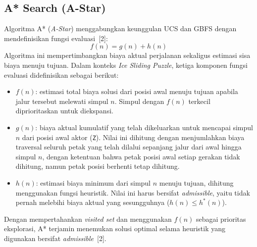 \documentclass[12pt,a4paper]{article}
\begin{document}
\subsection{A* Search (A-Star)}
Algoritma A* (\textit{A-Star}) menggabungkan keunggulan UCS dan GBFS dengan
mendefinisikan fungsi evaluasi~[2]:
\[
  f(n) = g(n) + h(n)
\]
Algoritma ini mempertimbangkan biaya aktual perjalanan sekaligus estimasi sisa biaya
menuju tujuan. Dalam konteks \textit{Ice Sliding Puzzle}, ketiga komponen fungsi
evaluasi didefinisikan sebagai berikut:
\begin{itemize}
    \item $f(n)$: estimasi total biaya solusi dari posisi awal menuju tujuan apabila
    jalur tersebut melewati simpul $n$. Simpul dengan $f(n)$ terkecil diprioritaskan
    untuk diekspansi.
    \item $g(n)$: biaya aktual kumulatif yang telah dikeluarkan untuk mencapai simpul
    $n$ dari posisi awal aktor (\texttt{Z}). Nilai ini dihitung dengan menjumlahkan
    biaya traversal seluruh petak yang telah dilalui sepanjang jalur dari awal hingga
    simpul $n$, dengan ketentuan bahwa petak posisi awal setiap gerakan tidak
    dihitung, namun petak posisi berhenti tetap dihitung.
    \item $h(n)$: estimasi biaya minimum dari simpul $n$ menuju tujuan, dihitung
    menggunakan fungsi heuristik. Nilai ini harus bersifat \textit{admissible}, yaitu
    tidak pernah melebihi biaya aktual yang sesungguhnya ($h(n) \leq h^*(n)$).
\end{itemize}
Dengan mempertahankan \textit{visited set} dan menggunakan $f(n)$ sebagai prioritas
eksplorasi, A* terjamin menemukan solusi optimal selama heuristik yang digunakan
bersifat \textit{admissible}~[2].
\end{document}
